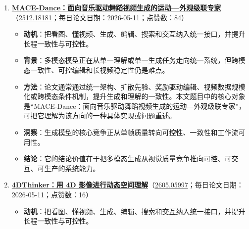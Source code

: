 \begin{enumerate}[leftmargin=1.5em]
\begin{itemize}[leftmargin=1.5em]
    \item \textbf{动机}：把看图、懂视频、生成、编辑、搜索和交互纳入统一接口，并提升长程一致性与可控性。
    \item \textbf{背景}：多模态模型正在从单一理解或单一生成任务走向统一系统，但跨模态一致性、可控编辑和长视频稳定性仍是难点。
    \item \textbf{方法}：论文通常通过统一架构、扩散先验、奖励驱动编辑、视频数据规模化或跨模态条件机制，提升生成和理解的一致性。本文题目中的核心对象是“LLaVA-UHD v4：高效多模态大模型视觉编码的关键因素”，可把它理解为该方向的一种具体实现或问题重述。
    \item \textbf{洞察}：生成模型的核心竞争正从单帧质量转向可控性、一致性和工作流可用性。
    \item \textbf{结论}：它的结论价值在于把多模态生成从视觉质量竞争推向可控、可交互、可生产的系统能力。
  \end{itemize}
  \item \textbf{\href{https://huggingface.co/papers/2512.18181}{MACE-Dance：面向音乐驱动舞蹈视频生成的运动—外观级联专家}}（\href{https://arxiv.org/abs/2512.18181}{2512.18181}；每日论文日期：2026-05-11；点赞数：84）
  \begin{itemize}[leftmargin=1.5em]
    \item \textbf{动机}：把看图、懂视频、生成、编辑、搜索和交互纳入统一接口，并提升长程一致性与可控性。
    \item \textbf{背景}：多模态模型正在从单一理解或单一生成任务走向统一系统，但跨模态一致性、可控编辑和长视频稳定性仍是难点。
    \item \textbf{方法}：论文通常通过统一架构、扩散先验、奖励驱动编辑、视频数据规模化或跨模态条件机制，提升生成和理解的一致性。本文题目中的核心对象是“MACE-Dance：面向音乐驱动舞蹈视频生成的运动—外观级联专家”，可把它理解为该方向的一种具体实现或问题重述。
    \item \textbf{洞察}：生成模型的核心竞争正从单帧质量转向可控性、一致性和工作流可用性。
    \item \textbf{结论}：它的结论价值在于把多模态生成从视觉质量竞争推向可控、可交互、可生产的系统能力。
  \end{itemize}
  \item \textbf{\href{https://huggingface.co/papers/2605.05997}{4DThinker：用 4D 影像进行动态空间理解}}（\href{https://arxiv.org/abs/2605.05997}{2605.05997}；每日论文日期：2026-05-11；点赞数：16）
  \begin{itemize}[leftmargin=1.5em]
    \item \textbf{动机}：把看图、懂视频、生成、编辑、搜索和交互纳入统一接口，并提升长程一致性与可控性。

\end{itemize}
\end{enumerate}
